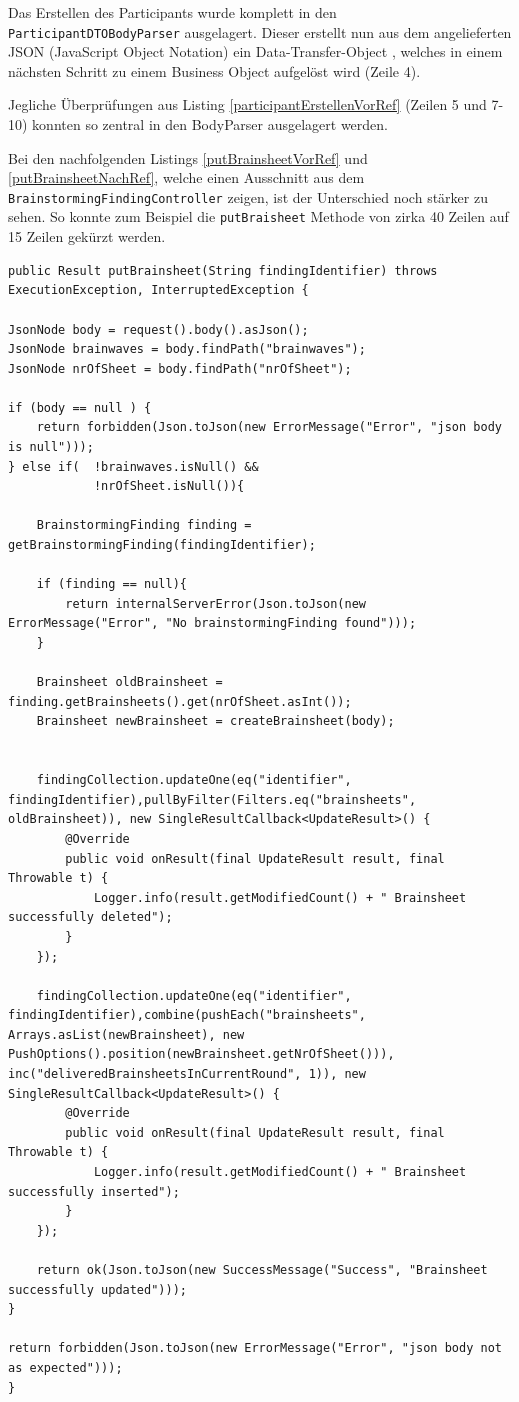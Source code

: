 Das Erstellen des Participants wurde komplett in den \texttt{Participant\-DTO\-Body\-Parser} ausgelagert. Dieser erstellt nun aus dem angelieferten JSON (JavaScript Object Notation) ein Data-Transfer-Object \cite{DTO}, welches in einem nächsten Schritt zu einem Business Object aufgelöst wird (Zeile 4).

Jegliche Überprüfungen aus Listing \ref{participantErstellenVorRef} (Zeilen 5 und 7-10) konnten so zentral in den BodyParser ausgelagert werden.

Bei den nachfolgenden Listings \ref{putBrainsheetVorRef} und \ref{putBrainsheetNachRef}, welche einen Ausschnitt aus dem \texttt{Brain\-storming\-Finding\-Controller} zeigen, ist der Unterschied noch stärker zu sehen. So konnte zum Beispiel die \texttt{putBraisheet} Methode von zirka 40 Zeilen auf 15 Zeilen gekürzt werden. 

\begin{lstlisting}[caption={PutBrainsheet vor Refactoring}, label=putBrainsheetVorRef]
public Result putBrainsheet(String findingIdentifier) throws ExecutionException, InterruptedException {

JsonNode body = request().body().asJson();
JsonNode brainwaves = body.findPath("brainwaves");
JsonNode nrOfSheet = body.findPath("nrOfSheet");

if (body == null ) {
    return forbidden(Json.toJson(new ErrorMessage("Error", "json body is null")));
} else if(  !brainwaves.isNull() &&
            !nrOfSheet.isNull()){

	BrainstormingFinding finding = getBrainstormingFinding(findingIdentifier);

    if (finding == null){
        return internalServerError(Json.toJson(new ErrorMessage("Error", "No brainstormingFinding found")));
    }

    Brainsheet oldBrainsheet = finding.getBrainsheets().get(nrOfSheet.asInt());
    Brainsheet newBrainsheet = createBrainsheet(body);


    findingCollection.updateOne(eq("identifier", findingIdentifier),pullByFilter(Filters.eq("brainsheets", oldBrainsheet)), new SingleResultCallback<UpdateResult>() {
        @Override
        public void onResult(final UpdateResult result, final Throwable t) {
            Logger.info(result.getModifiedCount() + " Brainsheet successfully deleted");
        }
    });

    findingCollection.updateOne(eq("identifier", findingIdentifier),combine(pushEach("brainsheets", Arrays.asList(newBrainsheet), new PushOptions().position(newBrainsheet.getNrOfSheet())), inc("deliveredBrainsheetsInCurrentRound", 1)), new SingleResultCallback<UpdateResult>() {
        @Override
        public void onResult(final UpdateResult result, final Throwable t) {
            Logger.info(result.getModifiedCount() + " Brainsheet successfully inserted");
        }
    });

    return ok(Json.toJson(new SuccessMessage("Success", "Brainsheet successfully updated")));
}

return forbidden(Json.toJson(new ErrorMessage("Error", "json body not as expected")));
}
\end{lstlisting}


